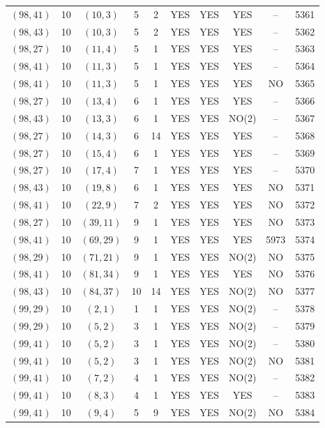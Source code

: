 \begin{longtable}{|c|c|c|c|c|c|c|c|c|c|}
$(98, 41)$ & 10 & $(10, 3)$ & 5 & 2 & YES & YES & YES & -- & 5361\\
$(98, 43)$ & 10 & $(10, 3)$ & 5 & 2 & YES & YES & YES & -- & 5362\\
$(98, 27)$ & 10 & $(11, 4)$ & 5 & 1 & YES & YES & YES & -- & 5363\\
$(98, 41)$ & 10 & $(11, 3)$ & 5 & 1 & YES & YES & YES & -- & 5364\\
$(98, 41)$ & 10 & $(11, 3)$ & 5 & 1 & YES & YES & YES & NO & 5365\\
$(98, 27)$ & 10 & $(13, 4)$ & 6 & 1 & YES & YES & YES & -- & 5366\\
$(98, 43)$ & 10 & $(13, 3)$ & 6 & 1 & YES & YES & NO(2) & -- & 5367\\
$(98, 27)$ & 10 & $(14, 3)$ & 6 & 14 & YES & YES & YES & -- & 5368\\
$(98, 27)$ & 10 & $(15, 4)$ & 6 & 1 & YES & YES & YES & -- & 5369\\
$(98, 27)$ & 10 & $(17, 4)$ & 7 & 1 & YES & YES & YES & -- & 5370\\
$(98, 43)$ & 10 & $(19, 8)$ & 6 & 1 & YES & YES & YES & NO & 5371\\
$(98, 41)$ & 10 & $(22, 9)$ & 7 & 2 & YES & YES & YES & NO & 5372\\
$(98, 27)$ & 10 & $(39, 11)$ & 9 & 1 & YES & YES & YES & NO & 5373\\
$(98, 41)$ & 10 & $(69, 29)$ & 9 & 1 & YES & YES & YES & 5973 & 5374\\
$(98, 29)$ & 10 & $(71, 21)$ & 9 & 1 & YES & YES & NO(2) & NO & 5375\\
$(98, 41)$ & 10 & $(81, 34)$ & 9 & 1 & YES & YES & YES & NO & 5376\\
$(98, 43)$ & 10 & $(84, 37)$ & 10 & 14 & YES & YES & NO(2) & NO & 5377\\
$(99, 29)$ & 10 & $(2, 1)$ & 1 & 1 & YES & YES & NO(2) & -- & 5378\\
$(99, 29)$ & 10 & $(5, 2)$ & 3 & 1 & YES & YES & NO(2) & -- & 5379\\
$(99, 41)$ & 10 & $(5, 2)$ & 3 & 1 & YES & YES & NO(2) & -- & 5380\\
$(99, 41)$ & 10 & $(5, 2)$ & 3 & 1 & YES & YES & NO(2) & NO & 5381\\
$(99, 41)$ & 10 & $(7, 2)$ & 4 & 1 & YES & YES & NO(2) & -- & 5382\\
$(99, 41)$ & 10 & $(8, 3)$ & 4 & 1 & YES & YES & YES & -- & 5383\\
$(99, 41)$ & 10 & $(9, 4)$ & 5 & 9 & YES & YES & NO(2) & NO & 5384\\

\end{longtable}

